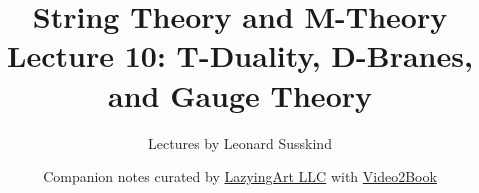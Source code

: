 \documentclass[11pt,oneside]{book}
\begin{document}
\hypersetup{pageanchor=false}
\frontmatter
\title{String Theory and M-Theory\\[0.45em]
\large Lecture 10: T-Duality, D-Branes, and Gauge Theory}
\author{Lectures by Leonard Susskind}
\date{Companion notes curated by
\href{https://lazying.art}{LazyingArt LLC} with
\href{https://github.com/lachlanchen/Video2Book}{Video2Book}}
\maketitle
\clearpage
\hypersetup{pageanchor=true}
\mainmatter

\end{document}
